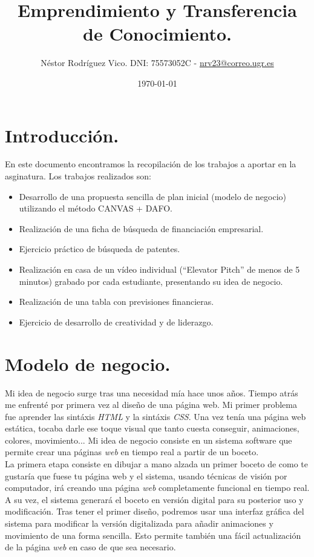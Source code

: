 \documentclass[12pt]{article}
\title{Emprendimiento y Transferencia de Conocimiento.}
\author{Néstor Rodríguez Vico. DNI: 75573052C - \href{mailto:nrv23@correo.ugr.es}{nrv23@correo.ugr.es}}
\date{\today}
\begin{document}
\maketitle

\setlength{\belowdisplayskip}{5pt} 
\setlength{\belowdisplayshortskip}{5pt}
\setlength{\abovedisplayskip}{5pt} 
\setlength{\abovedisplayshortskip}{5pt}

\section{Introducción.}

En este documento encontramos la recopilación de los trabajos a aportar en la asginatura. Los trabajos realizados son:

\begin{itemize}
	\item Desarrollo de una propuesta sencilla de plan inicial (modelo de negocio) utilizando el método CANVAS + DAFO.
	\item Realización de una ficha de búsqueda de financiación empresarial.
	\item Ejercicio práctico de búsqueda de patentes.
	\item Realización en casa de un vídeo individual (``Elevator Pitch'' de menos de 5 minutos) grabado por cada estudiante, presentando su idea de negocio.
	\item Realización de una tabla con previsiones financieras.
	\item Ejercicio de desarrollo de creatividad y de liderazgo.
\end{itemize}

\section{Modelo de negocio.}

Mi idea de negocio surge tras una necesidad mía hace unos años. Tiempo atrás me enfrenté por primera vez al diseño de una página web. Mi primer problema fue aprender las sintáxis \textit{HTML} y la sintáxis \textit{CSS}. Una vez tenía una página web estática, tocaba darle ese toque visual que tanto cuesta conseguir, animaciones, colores, movimiento... Mi idea de negocio consiste en un sistema software que permite crear una páginas \textit{web} en tiempo real a partir de un boceto. \\

La primera etapa consiste en dibujar a mano alzada un primer boceto de como te gustaría que fuese tu página web y el sistema, usando técnicas de visión por computador, irá creando una página \textit{web} completamente funcional en tiempo real. A su vez, el sistema generará el boceto en versión digital para su posterior uso y modificación. Tras tener el primer diseño, podremos usar una interfaz gráfica del sistema para modificar la versión digitalizada para añadir animaciones y movimiento de una forma sencilla. Esto permite también una fácil actualización de la página \textit{web} en caso de que sea necesario. \\ 
\end{document}
